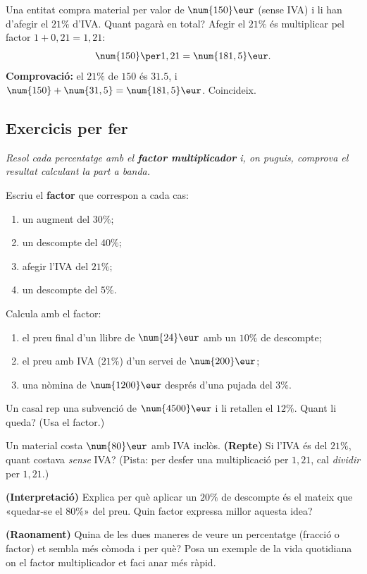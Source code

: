 \begin{exresolt}
Una entitat compra material per valor de $\num{150}\eur$ (sense IVA) i li han d'afegir
el $21\%$ d'IVA. Quant pagarà en total?
\solucio
Afegir el $21\%$ és multiplicar pel factor $1+0,21=1,21$:
\[
\num{150}\per 1,21=\num{181,5}\eur.
\]
\textbf{Comprovació:} el $21\%$ de $\num{150}$ és $\num{31,5}$, i
$\num{150}+\num{31,5}=\num{181,5}\eur$. Coincideix.
\end{exresolt}

\subsection{Exercicis per fer}

\noindent\textit{Resol cada percentatge amb el \textbf{factor multiplicador} i, on
puguis, comprova el resultat calculant la part a banda.}

\begin{exercicis}
\begin{exlist}
  \item Escriu el \textbf{factor} que correspon a cada cas:
    \begin{enumerate}[label=\alph*), leftmargin=1.6em, topsep=2pt]
      \item un augment del $30\%$;
      \item un descompte del $40\%$;
      \item afegir l'IVA del $21\%$;
      \item un descompte del $5\%$.
    \end{enumerate}
  \item Calcula amb el factor:
    \begin{enumerate}[label=\alph*), leftmargin=1.6em, topsep=2pt]
      \item el preu final d'un llibre de $\num{24}\eur$ amb un $10\%$ de descompte;
      \item el preu amb IVA ($21\%$) d'un servei de $\num{200}\eur$;
      \item una nòmina de $\num{1200}\eur$ després d'una pujada del $3\%$.
    \end{enumerate}
  \item Un casal rep una subvenció de $\num{4500}\eur$ i li retallen el $12\%$. Quant
        li queda? (Usa el factor.)
  \item Un material costa $\num{80}\eur$ amb IVA inclòs. \textbf{(Repte)} Si l'IVA és
        del $21\%$, quant costava \emph{sense} IVA? (Pista: per desfer una
        multiplicació per $1,21$, cal \emph{dividir} per $1,21$.)
  \item \textbf{(Interpretació)} Explica per què aplicar un $20\%$ de descompte és el
        mateix que «quedar-se el $80\%$» del preu. Quin factor expressa millor aquesta
        idea?
  \item \textbf{(Raonament)} Quina de les dues maneres de veure un percentatge
        (fracció o factor) et sembla més còmoda i per què? Posa un exemple de la vida
        quotidiana on el factor multiplicador et faci anar més ràpid.
\end{exlist}
\end{exercicis}

